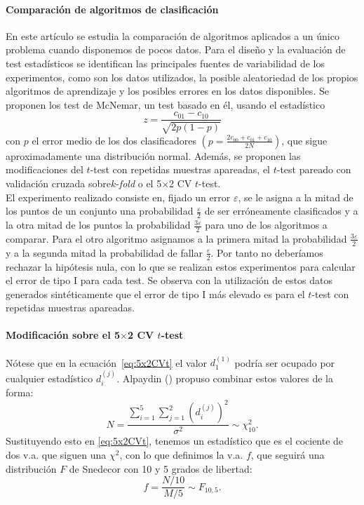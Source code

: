 \paragraph{Comparación de algoritmos de clasificación} 
\cite{dietterich1998approximate}
En este artículo se estudia la comparación de algoritmos
aplicados a un único problema cuando disponemos de pocos
datos. Para el diseño y la evaluación de test estadísticos
se identifican las principales fuentes de 
variabilidad de los experimentos, como son los 
datos utilizados, la posible aleatoriedad de los 
propios algoritmos de aprendizaje y los posibles errores en
los datos disponibles. Se proponen los test de McNemar, un
test basado en él, usando el estadístico
	\[
		z = \frac{c_{01}-c_{10}}{\sqrt{2p(1-p)}}
	\]
	con $p$ el error medio de los dos clasificadores $\left(
p = \frac{2c_{00}+c_{01}+c_{10}}{2N}\right)$, que sigue
aproximadamente una distribución normal. Además,
se proponen las modificaciones del $t$-test con repetidas
muestras apareadas, el $t$-test pareado con validación
cruzada sobre$k$-\textit{fold} o el 5$\times$2 CV $t$-test.\\
	El experimento realizado consiste en, fijado un error 
$\varepsilon$, se le asigna a la mitad de los puntos
de un conjunto una probabilidad $\frac{\varepsilon}{2}$
de ser erróneamente clasificados
y a la otra mitad de los puntos la probabilidad
$\frac{3\varepsilon}{2}$ para uno de los algoritmos a
comparar. Para el otro algoritmo asignamos a la primera
mitad la probabilidad $\frac{3\varepsilon}{2}$ y a la
segunda mitad la probabilidad de fallar 
$\frac{\varepsilon}{2}$. Por tanto no deberíamos
rechazar la hipótesis nula, con lo que se realizan estos
experimentos para calcular el error de tipo I
para cada test. Se observa con la utilización de estos
datos generados sintéticamente que el error de tipo I más
elevado es para el $t$-test con repetidas
muestras apareadas.


\paragraph{Modificación sobre el 5$\times$2 CV $t$-test} Nótese que en la 
ecuación~\ref{eq:5x2CVt} el valor $d_1^{(1)}$ podría ser
ocupado por cualquier estadístico $d_i^{(j)}$. Alpaydin 
(\cite{Alpaydin98combined5})
propuso combinar estos valores de la forma:
	\[
		N = \frac{\sum\limits_{i=1}^5
				\sum\limits_{j=1}^2
					\left( d_i^{(j)} \right)^2}
				{\sigma^2}
			\sim \chi_{10}^2.
	\]
	Sustituyendo esto en \ref{eq:5x2CVt}, tenemos
un estadístico que es el cociente de dos v.a. que siguen 
una $\chi^2$, con lo que definimos la v.a. $f$, que seguirá
una distribución $F$ de Snedecor con 10 y 5 grados de
libertad:
	\[ 
		f = \frac{N/10}{M/5} \sim F_{10,5}.
	\]	
	
